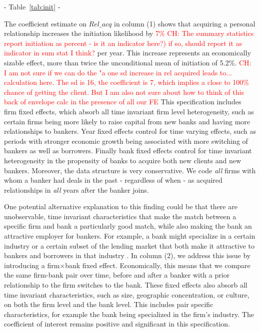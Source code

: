 \begin{center} - Table~\ref{tab:init} - \end{center}

The coefficient estimate on $Rel\_acq$ in column (1) shows that acquiring a personal relationship increases the initiation likelihood by \textcolor{red}{7\% CH: The summary statistics report initiation as percent - is it an indicator here?) if so, should report it as indicator in sum stat I think?} per year. This increase represents  an economically sizable effect, more than twice the unconditional mean of initiation of 5.2\%. \textcolor{red}{CH: I am not sure if we can do the "a one sd increase in rel acquired leads to... calculation here. The sd is 16, the coefficient is 7, which  implies a close to 100\% chance of getting the client. But I am also not sure about how to think of this back of envelope calc in the presence of all our FE  }
This specification includes firm fixed effects, which absorb all time invariant firm level heterogeneity, such as certain firms being more likely to raise capital from new banks and having more relationships to bankers. Year fixed effects control for time varying effects, such as periods with stronger economic growth being associated with more switching of bankers as well as borrowers. Finally bank fixed effects control for time invariant heterogeneity in the propensity of banks to acquire both new clients and new bankers. 
Moreover, the data structure is very conservative. We code \emph{all} firms with whom a banker had deals in the past - regardless of when - as acquired relationships in \emph{all} years after the banker joins.

One potential alternative explanation to this finding could be that there are unobservable, time invariant characteristics that make the match between a specific firm and bank a particularly good match, while also making the bank an attractive employer for bankers. For example, a bank might specialize in a certain industry or a certain subset of the lending market that both make it attractive to bankers and borrowers in that industry . 
In column (2), we address this issue by introducing a firm$\times$bank fixed effect. Economically, this means that we compare the same firm-bank pair over time, before and after a banker with a prior relationship to the firm switches to the bank. These fixed effects also absorb all time invariant characteristics, such as size, geographic concentration, or culture, on both the firm level and the bank level. This includes pair specific characteristics, for example the bank being specialized in the firm's industry. The coefficient of interest remains positive and significant in this specification.

